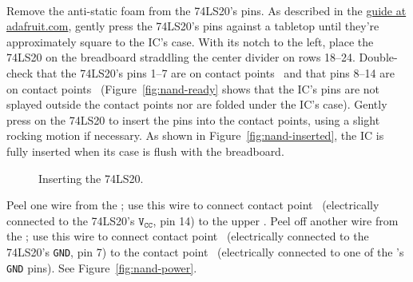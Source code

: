 \disconnect\


Remove the anti-static foam from the 74LS20's pins.
As described in the \href{https://learn.adafruit.com/breadboards-for-beginners/breadboard-usage}{guide at adafruit.com}, gently press the 74LS20's pins against a tabletop until they're approximately square to the IC's case.
With its notch to the left, place the 74LS20 on the breadboard straddling the center divider on rows 18--24.
Double-check that the 74LS20's pins 1--7 are on contact points \nandlowerrow\ and that pins 8--14 are on contact points \nandupperrow\ (Figure~\ref{fig:nand-ready} shows that the IC's pins are not splayed outside the contact points nor are folded under the IC's case).
Gently press on the 74LS20 to insert the pins into the contact points, using a slight rocking motion if necessary.
As shown in Figure~\ref{fig:nand-inserted}, the IC is fully inserted when its case is flush with the breadboard.

\begin{figure}
    \centering
    \hfil
    \caption{Inserting the 74LS20.}
\end{figure}

Peel one wire from the \rainbow;
use this wire to connect contact point \nandvcc\ (electrically connected to the 74LS20's $\mathtt{V_{CC}}$, pin 14) to the upper \power.
Peel off another wire from the \rainbow;
use this wire to connect contact point \nandground\ (electrically connected to the 74LS20's \texttt{GND}, pin 7) to the contact point \mculowergroundcontactpoint\ (electrically connected to one of the \developmentboard's \texttt{GND} pins).
See Figure~\ref{fig:nand-power}.

